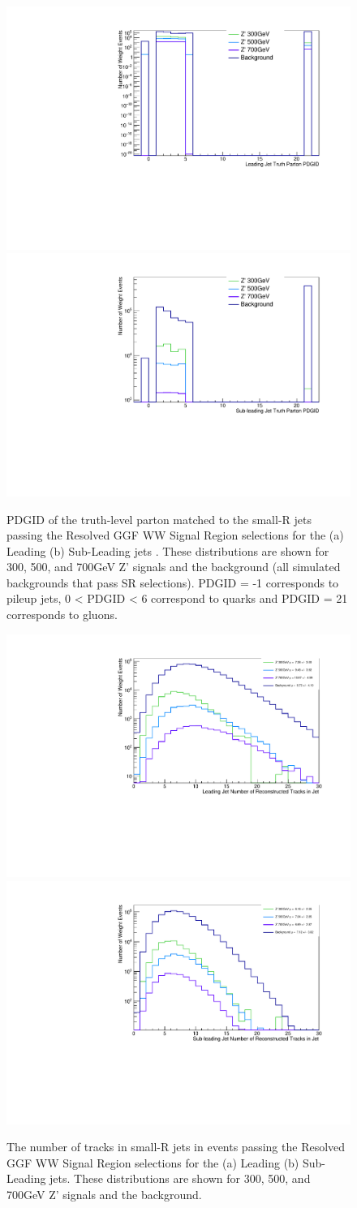 \begin{figure}[h!]
  \centering
  \includegraphics[width=0.45\hsize]{figures/QGT/sigWJ1_pdgid_Pass_Res_GGF_WW_SR.pdf}
 \includegraphics[width=0.45\hsize]{figures/QGT/sigWJ2_pdgid_Pass_Res_GGF_WW_SR.pdf}
  \caption{PDGID of the truth-level parton matched to the small-R jets passing the Resolved GGF WW Signal Region selections for the (a) Leading (b) Sub-Leading jets . These distributions are shown for 300, 500, and 700GeV Z' signals and the background (all simulated backgrounds that pass SR selections). PDGID = -1 corresponds to pileup jets, 0 < PDGID < 6 correspond to quarks and PDGID = 21 corresponds to gluons.}
  \label{fig:diag_pdgid}
\end{figure}
\FloatBarrier



\begin{figure}[h!]
  \centering
  \includegraphics[width=0.45\hsize]{figures/QGT/sigWJ1_nTrk_Pass_Res_GGF_WW_SR.pdf}
 \includegraphics[width=0.45\hsize]{figures/QGT/sigWJ2_nTrk_Pass_Res_GGF_WW_SR.pdf}
  \caption{The number of tracks in small-R jets in events passing the Resolved GGF WW Signal Region selections for the (a) Leading (b) Sub-Leading jets. These distributions are shown for 300, 500, and 700GeV Z' signals and the background.}
  \label{fig:diag_ntrk}
\end{figure}
\FloatBarrier


